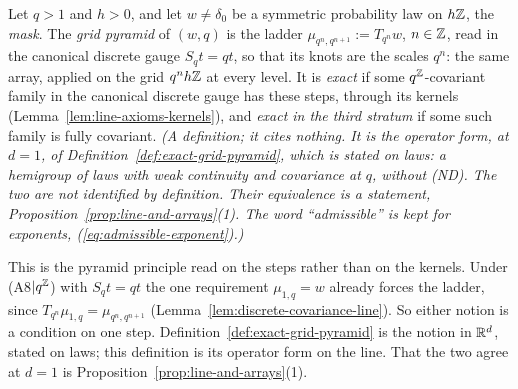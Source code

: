 \begin{definition}
\label{def:grid-pyramid-line}
\leanok
{}
Let $q > 1$ and $h > 0$, and let $w \ne \delta_0$ be a symmetric probability law on $h\mathbb{Z}$, the
\emph{mask}. The \emph{grid pyramid} of $(w, q)$ is the ladder $\mu_{q^n,q^{n+1}} := T_{q^n}w$,
$n \in \mathbb{Z}$, read in the canonical discrete gauge $S_qt = qt$, so that its knots are the scales
$q^n$: the same array, applied on the grid $q^nh\mathbb{Z}$ at every level. It is
\emph{exact} if some $q^{\mathbb{Z}}$-covariant family in the canonical discrete gauge has these
steps, through its kernels (Lemma~\ref{lem:line-axioms-kernels}), and \emph{exact in the third stratum} if
some such family is fully covariant.
\statusT\quad\emph{(A definition; it cites nothing. It is the operator form, at $d = 1$, of
Definition~\ref{def:exact-grid-pyramid}, which is stated on laws: a hemigroup of laws with weak
continuity and covariance at $q$, without (ND). The two are not identified by definition. Their
equivalence is a statement, Proposition~\ref{prop:line-and-arrays}(1). The word ``admissible'' is
kept for exponents, (\ref{eq:admissible-exponent}).)}
\end{definition}

This is the pyramid principle read on the steps rather than on the kernels. Under
(A8$|q^{\mathbb{Z}}$) with $S_qt = qt$ the one requirement $\mu_{1,q} = w$ already forces the ladder,
since $T_{q^n}\mu_{1,q} = \mu_{q^n,q^{n+1}}$ (Lemma~\ref{lem:discrete-covariance-line}). So either
notion is a condition on one step. Definition~\ref{def:exact-grid-pyramid} is the notion in
$\mathbb{R}^d$, stated on laws; this definition is its operator form on the line. That the two agree at
$d = 1$ is Proposition~\ref{prop:line-and-arrays}(1).

